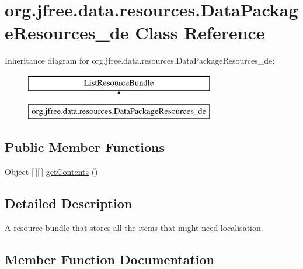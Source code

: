 \hypertarget{classorg_1_1jfree_1_1data_1_1resources_1_1_data_package_resources__de}{}\section{org.\+jfree.\+data.\+resources.\+Data\+Package\+Resources\+\_\+de Class Reference}
\label{classorg_1_1jfree_1_1data_1_1resources_1_1_data_package_resources__de}
Inheritance diagram for org.\+jfree.\+data.\+resources.\+Data\+Package\+Resources\+\_\+de\+:\begin{figure}[H]
\begin{center}
\leavevmode
\includegraphics[height=2.000000cm]{classorg_1_1jfree_1_1data_1_1resources_1_1_data_package_resources__de}
\end{center}
\end{figure}
\subsection*{Public Member Functions}
\begin{DoxyCompactItemize}
\item 
Object \mbox{[}$\,$\mbox{]}\mbox{[}$\,$\mbox{]} \mbox{\hyperlink{classorg_1_1jfree_1_1data_1_1resources_1_1_data_package_resources__de_a5b86127e3a0f98aa6e86de7dea8668d6}{get\+Contents}} ()
\end{DoxyCompactItemize}


\subsection{Detailed Description}
A resource bundle that stores all the items that might need localisation. 

\subsection{Member Function Documentation}
\mbox{\label{classorg_1_1jfree_1_1data_1_1resources_1_1_data_package_resources__de_a5b86127e3a0f98aa6e86de7dea8668d6}} 

